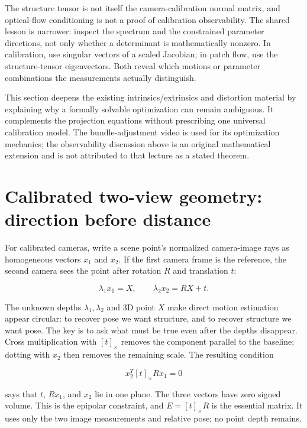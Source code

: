 The structure tensor is not itself the camera-calibration normal matrix, and optical-flow conditioning is not a proof of calibration observability. The shared lesson is narrower: inspect the spectrum and the constrained parameter directions, not only whether a determinant is mathematically nonzero. In calibration, use singular vectors of a scaled Jacobian; in patch flow, use the structure-tensor eigenvectors. Both reveal which motions or parameter combinations the measurements actually distinguish.

This section deepens the existing intrinsics/extrinsics and distortion material by explaining why a formally solvable optimization can remain ambiguous. It complements the projection equations without prescribing one universal calibration model. The bundle-adjustment video is used for its optimization mechanics; the observability discussion above is an original mathematical extension and is not attributed to that lecture as a stated theorem.

\section{Calibrated two-view geometry: direction before distance}\label{02-foundations-ii-ch036-calibrated-two-view-geometry-direction-before-distance}

\hypertarget{02-foundations-ii-ch036-calibrated-two-view-geometry-direction-before-distance}{}

For calibrated cameras, write a scene point's normalized camera-image rays as homogeneous vectors \(x_1\) and \(x_2\). If the first camera frame is the reference, the second camera sees the point after rotation \(R\) and translation \(t\):

\[\lambda_1x_1=X,\qquad \lambda_2x_2=RX+t.\]

The unknown depths \(\lambda_1,\lambda_2\) and 3D point \(X\) make direct motion estimation appear circular: to recover pose we want structure, and to recover structure we want pose. The key is to ask what must be true even after the depths disappear. Cross multiplication with \([t]_\times\) removes the component parallel to the baseline; dotting with \(x_2\) then removes the remaining scale. The resulting condition

\[x_2^T[t]_\times R x_1=0\]

says that \(t\), \(Rx_1\), and \(x_2\) lie in one plane. The three vectors have zero signed volume. This is the epipolar constraint, and \(E=[t]_\times R\) is the essential matrix. It uses only the two image measurements and relative pose; no point depth remains.


